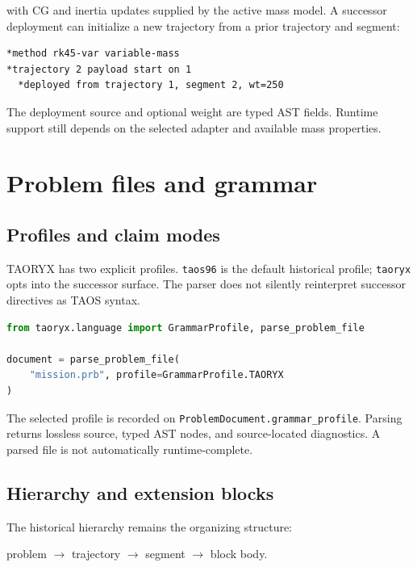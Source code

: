 \documentclass[11pt,twoside,openany]{book}
\begin{document}
with CG and inertia updates supplied by the active mass model. A successor
deployment can initialize a new trajectory from a prior trajectory and segment:

\begin{lstlisting}
*method rk45-var variable-mass
*trajectory 2 payload start on 1
  *deployed from trajectory 1, segment 2, wt=250
\end{lstlisting}

The deployment source and optional weight are typed AST fields. Runtime support
still depends on the selected adapter and available mass properties.

\chapter{Problem files and grammar}
\label{chap:successor-problem}

\section{Profiles and claim modes}

TAORYX has two explicit profiles. \texttt{taos96} is the default historical
profile; \texttt{taoryx} opts into the successor surface. The parser does not
silently reinterpret successor directives as TAOS syntax.

\begin{lstlisting}[language=Python]
from taoryx.language import GrammarProfile, parse_problem_file

document = parse_problem_file(
    "mission.prb", profile=GrammarProfile.TAORYX
)
\end{lstlisting}

The selected profile is recorded on \texttt{ProblemDocument.grammar\_profile}.
Parsing returns lossless source, typed AST nodes, and source-located
diagnostics. A parsed file is not automatically runtime-complete.

\section{Hierarchy and extension blocks}

The historical hierarchy remains the organizing structure:

\begin{center}
problem $\rightarrow$ trajectory $\rightarrow$ segment $\rightarrow$ block body.
\end{center}
\end{document}

